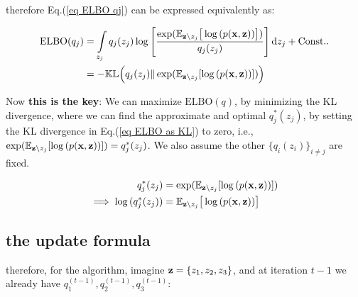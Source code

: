 \documentclass{article}
\def\C{\text{Const.}}
\begin{document}
therefore Eq.(\ref{eq ELBO qj}) can be expressed equivalently as:

\begin{equation}\begin{split}\label{eq ELBO as KL}
 \text{ELBO}(q_j) &= \int\limits_{z_j} q_j(z_j) \log \left[  \frac{\exp(\E_{\z \setminus z_j} \big[ \log{(p(\x,\z))} \big]  )} { q_j(z_j) }   \right] \d z_j + \C.\\
&=- \KL \Big(  q_j(z_j) \| \exp(\E_{\z \setminus z_j} [ \log{(p(\x,\z))} ]) \Big)\\
\end{split}\end{equation}

Now {\bf this is the key}: We can maximize $\text{ELBO}(q)$, by minimizing the KL divergence, where we can find the approximate and optimal  $q_{j}^*(z_j)$, by setting the KL divergence in Eq.(\ref{eq ELBO as KL}) to zero, i.e., $\exp(\mathbb{E}_{{\mathbf z} \setminus z_j} [ \log{(p({\mathbf x},{\mathbf z}))} ]) =  q_j^*(z_j) $. We also assume the other $\{ q_i(z_i) \}_{i \ne j}$ are fixed.

\begin{equation}\begin{split}\label{eq: ELBO meanfield}
q_j^*(z_j) &= \exp(\mathbb{E}_{{\mathbf z} \setminus z_j} [ \log{(p({\mathbf x},{\mathbf z}))} ])\\ 
\implies \log{ ( q_{j}^*(z_j)) } &= \mathbb{E}_{{\mathbf z} \setminus z_j} \big[ \log{(p({\mathbf x},{\mathbf z}))} \big]\\
\end{split}\end{equation}

\subsection{the update formula}

therefore, for the algorithm, imagine ${\mathbf z} = \{ z_1, z_2, z_3 \}$, and at iteration $t -1$ we already have $q_1^{(t-1)}, q_2^{(t-1)}, q_3^{(t-1)}$:
\end{document}
